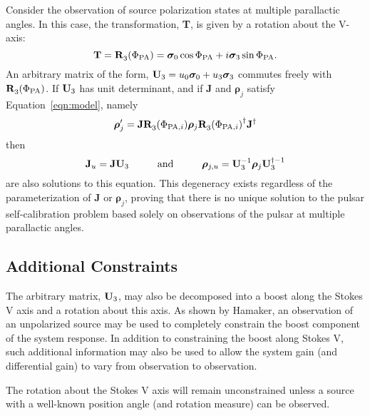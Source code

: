 \documentclass[12pt]{article}
\newcommand{\rotation}[3]{{\ensuremath{ {\bf R}^{#3}_{#1}({#2}) }}}
\begin{document}
Consider the observation of source polarization states at multiple
parallactic angles.  In this case, the transformation, {\bf T}, is
given by a rotation about the V-axis:
\begin{equation}
{\bf T}=\rotation{3}{\Phi_{\rm PA}}{ } = \bm{\sigma}_0\cos\Phi_{\rm PA}
	 + i\bm{\sigma}_3\sin\Phi_{\rm PA}.
\end{equation}
An arbitrary matrix of the form, ${\bf U}_3= u_0\bm{\sigma}_0 +
u_3\bm{\sigma}_3$ commutes freely with $\rotation{3}{\Phi_{\rm PA}}{
}$.  If ${\bf U}_3$ has unit determinant, and if {\bf J} and
${\bm\rho}_j$ satisfy Equation~\ref{eqn:model}, namely
\begin{equation}
{\bm\rho}^\prime_j = {\bf J}\rotation{3}{\Phi_{{\rm PA},i}}{ }{\bm\rho}_j{\rotation{3}{\Phi_{{\rm PA},i}}{ }}^\dagger{\bf J}^\dagger
\end{equation}
then 
\begin{equation}
{\bf J}_u = {\bf JU}_3 \hspace{1cm} {\rm and} \hspace{1cm}
{\bm\rho}_{j,u} = {\bf U}^{-1}_3{\bm\rho}_j{\bf U}^{\dagger-1}_3
\end{equation}
are also solutions to this equation.  This degeneracy exists
regardless of the parameterization of {\bf J} or ${\bm\rho}_j$,
proving that there is no unique solution to the pulsar
self-calibration problem based solely on observations of the pulsar at
multiple parallactic angles.

\subsection{Additional Constraints}

The arbitrary matrix, ${\bf U}_3$, may also be decomposed into a boost
along the Stokes V axis and a rotation about this axis.  As shown by
Hamaker, an observation of an unpolarized source may be used to
completely constrain the boost component of the system response.  In
addition to constraining the boost along Stokes V, such additional
information may also be used to allow the system gain (and
differential gain) to vary from observation to observation.

The rotation about the Stokes V axis will remain unconstrained unless
a source with a well-known position angle (and rotation measure) can
be observed.
\end{document}
